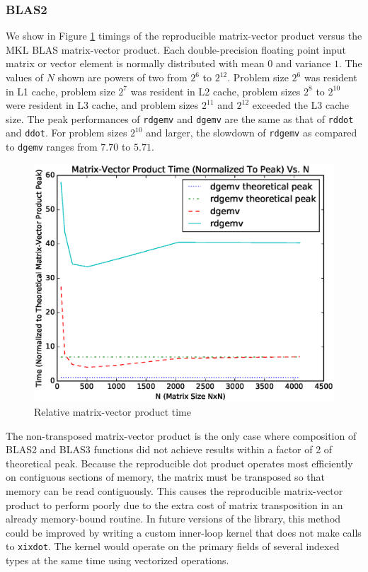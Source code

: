   \subsubsection{BLAS2}
    We show in Figure \ref{fig:gemv_timings} timings of the reproducible matrix-vector product versus the MKL BLAS matrix-vector product. Each double-precision floating point input matrix or vector element is normally distributed with mean $0$ and variance $1$. The values of $N$ shown are powers of two from $2^6$ to $2^{12}$. Problem size $2^6$ was resident in L1 cache, problem size $2^7$ was resident in L2 cache, problem sizes $2^8$ to $2^{10}$ were resident in L3 cache, and problem sizes $2^{11}$ and $2^{12}$ exceeded the L3 cache size. The peak performances of \texttt{rdgemv} and \texttt{dgemv} are the same as that of \texttt{rddot} and \texttt{ddot}. For problem sizes $2^{10}$ and larger, the slowdown of \texttt{rdgemv} as compared to \texttt{dgemv} ranges from $7.70$ to $5.71$.
  \begin{figure}[H]
  \begin{center}
  \includegraphics[width=\textwidth]{plots/gemv_comparison}
  \caption{Relative matrix-vector product time}
  \label{fig:gemv_timings}
  \end{center}
  \end{figure}
  The non-transposed matrix-vector product is the only case where composition of BLAS2 and BLAS3 functions did not achieve results within a factor of 2 of theoretical peak.  Because the reproducible dot product operates most efficiently on contiguous sections of memory, the matrix must be transposed so that memory can be read contiguously. This causes the reproducible matrix-vector product to perform poorly due to the extra cost of matrix transposition in an already memory-bound routine. In future versions of the library, this method could be improved by writing a custom inner-loop kernel that does not make calls to \texttt{xixdot}. The kernel would operate on the primary fields of several indexed types at the same time using vectorized operations.

